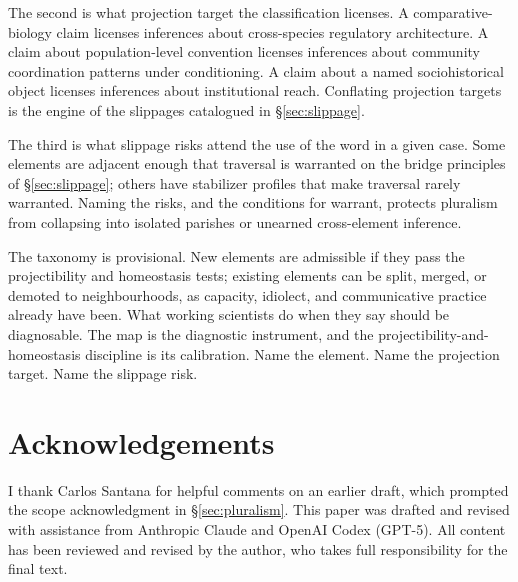 \documentclass[12pt]{article}
\begin{document}
The second is what projection target the classification licenses. A comparative-biology claim licenses inferences about cross-species regulatory architecture. A claim about population-level convention licenses inferences about community coordination patterns under conditioning. A claim about a named sociohistorical object licenses inferences about institutional reach. Conflating projection targets is the engine of the slippages catalogued in §\ref{sec:slippage}.

The third is what slippage risks attend the use of the word in a given case. Some elements are adjacent enough that traversal is warranted on the bridge principles of §\ref{sec:slippage}; others have stabilizer profiles that make traversal rarely warranted. Naming the risks, and the conditions for warrant, protects pluralism from collapsing into isolated parishes or unearned cross-element inference.

The taxonomy is provisional. New elements are admissible if they pass the projectibility and homeostasis tests; existing elements can be split, merged, or demoted to neighbourhoods, as capacity, idiolect, and communicative practice already have been. What working scientists do when they say  should be diagnosable. The map is the diagnostic instrument, and the projectibility-and-homeostasis discipline is its calibration. Name the element. Name the projection target. Name the slippage risk.

\section*{Acknowledgements}

I thank Carlos Santana for helpful comments on an earlier draft, which prompted the scope acknowledgment in §\ref{sec:pluralism}. This paper was drafted and revised with assistance from Anthropic Claude and OpenAI Codex (GPT-5). All content has been reviewed and revised by the author, who takes full responsibility for the final text.

\clearpage

\printbibliography
\end{document}
